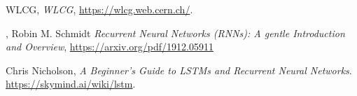 \begin{thebibliography}{99}
	
	WLCG, 
	\textit{WLCG},
	\url{https://wlcg.web.cern.ch/}.
	
	,
	Robin M. Schmidt
	\textit{Recurrent Neural Networks (RNNs): A gentle Introduction and Overview},
	\url{https://arxiv.org/pdf/1912.05911}

	Chris Nicholson, 
	\textit{A Beginner’s Guide to LSTMs and Recurrent Neural Networks}.
	\url{ https://skymind.ai/wiki/lstm}.

\end{thebibliography}